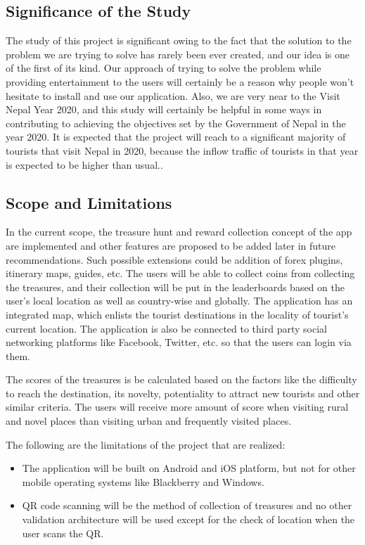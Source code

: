 \documentclass[12pt, a4paper, oneside]{article}
\begin{document}
\subsection{Significance of the Study}
The study of this project is significant owing to the fact that the solution to the problem we are trying to solve has rarely been ever created, and our idea is one of the first of its kind. Our approach of trying to solve the problem while providing entertainment to the users will certainly be a reason why people won't hesitate to install and use our application. Also, we are very near to the Visit Nepal Year 2020, and this study will certainly be helpful in some ways in contributing to achieving the objectives set by the Government of Nepal in the year 2020. It is expected that the project will reach to a significant majority of tourists that visit Nepal in 2020, because the inflow traffic of tourists in that year is expected to be higher than usual..

\subsection{Scope and Limitations}
In the current scope, the treasure hunt and reward collection concept of the app are implemented and other features are proposed to be added later in future recommendations. Such possible extensions could be addition of forex plugins, itinerary maps, guides, etc. The users will be able to collect coins from collecting the treasures, and their collection will be put in the leaderboards based on the user's local location as well as country-wise and globally. The application has an integrated map, which enlists the tourist destinations in the locality of tourist's current location. The application is also be connected to third party social networking platforms like Facebook, Twitter, etc. so that the users can login via them. 

The scores of the treasures is be calculated based on the factors like the difficulty to reach the destination, its novelty, potentiality to attract new tourists and other similar criteria. The users will receive more amount of score when visiting rural and novel places than visiting urban and frequently visited places.

The following are the limitations of the project that are realized:
\begin{itemize}
 	\item The application will be built on Android and iOS platform, but not for other mobile operating systems like Blackberry and Windows.
	\item QR code scanning will be the method of collection of treasures and no other validation architecture will be used except for the check of location when the user scans the QR.
 \end{itemize}
\end{document}
